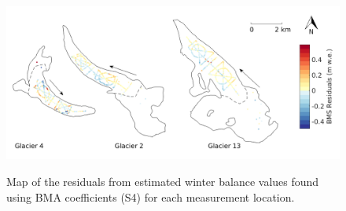 \documentclass{sfuthesis}
\begin{document}
\begin{figure}
	\centering
	\includegraphics[width =\textwidth]{residualsMap_BMS.png}\\
	\caption{Map of the residuals from estimated winter balance values found using BMA coefficients (S4) for each measurement location.}
	\label{fig:BMS_residualsMap}
\end{figure} 
\end{document}
